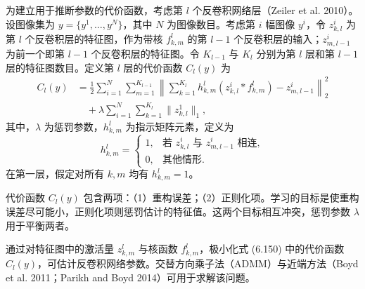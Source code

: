 为建立用于推断参数的代价函数，考虑第 $l$ 个反卷积网络层（Zeiler et al. 2010）。设图像集为 $y=\{y^1,\ldots,y^N\}$，其中 $N$ 为图像数目。考虑第 $i$ 幅图像 $y^i$，令 $z_{k,l}^i$ 为第 $l$ 个反卷积层的特征图，作为带核 $f_{k,m}^l$ 的第 $l-1$ 个反卷积层的输入；$z_{m,l-1}^i$ 为前一个即第 $l-1$ 个反卷积层的特征图。令 $K_{l-1}$ 与 $K_l$ 分别为第 $l$ 层和第 $l-1$ 层的特征图数目。定义第 $l$ 层的代价函数 $C_l(y)$ 为
\begin{equation}
\begin{aligned}
C_l(y)&=\frac12\sum_{i=1}^N\sum_{m=1}^{K_{l-1}}\left\lVert\sum_{k=1}^{K_l}h_{k,m}^l(z_{k,l}^i*f_{k,m}^l)-z_{m,l-1}^i\right\rVert_2^2\\
&\quad+\lambda\sum_{i=1}^N\sum_{k=1}^{K_l}\lVert z_{k,l}^1\rVert_1,
\end{aligned}\tag{6.151}
\end{equation}
其中，$\lambda$ 为惩罚参数，$h_{k,m}^l$ 为指示矩阵元素，定义为
\[
h_{k,m}^l=\begin{cases}1,&\text{若 }z_{k,l}^i\text{ 与 }z_{m,l-1}^i\text{ 相连},\\0,&\text{其他情形}.\end{cases}
\]
在第一层，假定对所有 $k,m$ 均有 $h_{k,m}^l=1$。

代价函数 $C_l(y)$ 包含两项：（1）重构误差；（2）正则化项。学习的目标是使重构误差尽可能小，正则化项则惩罚估计的特征值。这两个目标相互冲突，惩罚参数 $\lambda$ 用于平衡两者。

通过对特征图中的激活量 $z_{k,m}^l$ 与核函数 $f_{k,m}^l$，极小化式 (6.150) 中的代价函数 $C_l(y)$，可估计反卷积网络参数。交替方向乘子法（ADMM）与近端方法（Boyd et al. 2011；Parikh and Boyd 2014）可用于求解该问题。
